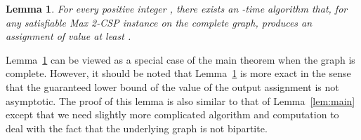 \documentclass{article}
\newtheorem{lemma}{Lemma}
\begin{document}
\begin{lemma} \label{lem:approx-complete-game}
  For every positive integer , there exists an -time algorithm that, for any satisfiable {\sc Max 2-CSP} instance on the complete graph, produces an assignment of value at least .
\end{lemma}

Lemma~\ref{lem:approx-complete-game} can be viewed as a special case of the main theorem when the graph is complete. However, it should be noted that Lemma~\ref{lem:approx-complete-game} is more exact in the sense that the guaranteed lower bound of the value of the output assignment is not asymptotic. The proof of this lemma is also similar to that of Lemma~\ref{lem:main} except that we need slightly more complicated algorithm and computation to deal with the fact that the underlying graph is not bipartite.
\end{document}
